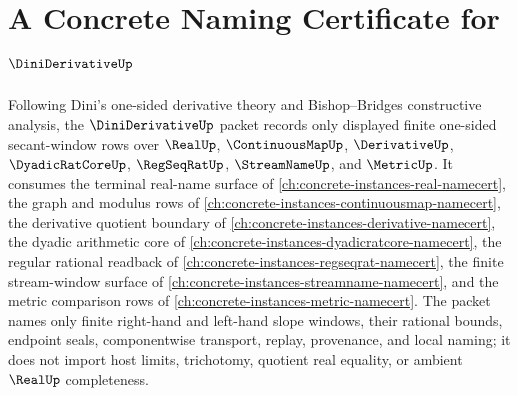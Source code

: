 \chapter{A Concrete Naming Certificate for $\DiniDerivativeUp$}
\label{ch:concrete-instances-dini-derivative-namecert}

Following Dini's one-sided derivative theory and Bishop--Bridges constructive analysis, the $\DiniDerivativeUp$ packet records only displayed finite one-sided secant-window rows over $\RealUp$, $\ContinuousMapUp$, $\DerivativeUp$, $\DyadicRatCoreUp$, $\RegSeqRatUp$, $\StreamNameUp$, and $\MetricUp$. It consumes the terminal real-name surface of \autoref{ch:concrete-instances-real-namecert}, the graph and modulus rows of \autoref{ch:concrete-instances-continuousmap-namecert}, the derivative quotient boundary of \autoref{ch:concrete-instances-derivative-namecert}, the dyadic arithmetic core of \autoref{ch:concrete-instances-dyadicratcore-namecert}, the regular rational readback of \autoref{ch:concrete-instances-regseqrat-namecert}, the finite stream-window surface of \autoref{ch:concrete-instances-streamname-namecert}, and the metric comparison rows of \autoref{ch:concrete-instances-metric-namecert}. The packet names only finite right-hand and left-hand slope windows, their rational bounds, endpoint seals, componentwise transport, replay, provenance, and local naming; it does not import host limits, trichotomy, quotient real equality, or ambient $\RealUp$ completeness.

